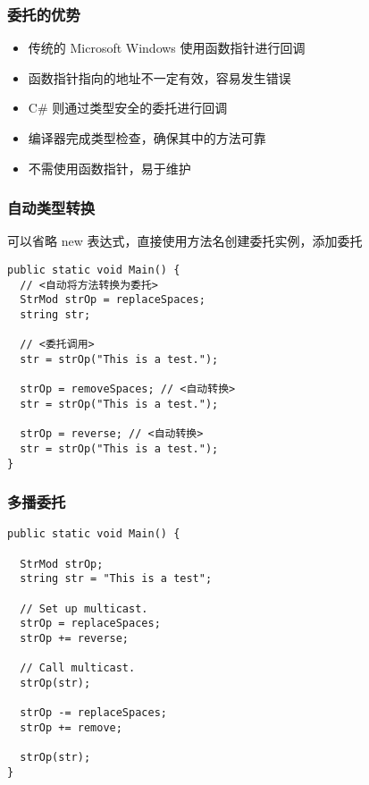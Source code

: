 \begin{frame}
\frametitle{委托的优势}

\begin{itemize}
\setlength{\itemsep}{6pt plus 1pt}
\item 传统的 Microsoft Windows 使用函数指针进行回调
\item 函数指针指向的地址不一定有效，容易发生错误
\item C\# 则通过类型安全的委托进行回调
\item 编译器完成类型检查，确保其中的方法可靠
\item 不需使用函数指针，易于维护
\end{itemize}

\end{frame}

\begin{frame}[fragile]
\frametitle{自动类型转换}
\CJKindent 可以省略 new 表达式，直接使用方法名创建委托实例，添加委托
\begin{lstlisting}[escapeinside=<>]
public static void Main() {
  // <自动将方法转换为委托>
  StrMod strOp = replaceSpaces;
  string str;

  // <委托调用>
  str = strOp("This is a test.");

  strOp = removeSpaces; // <自动转换>
  str = strOp("This is a test.");

  strOp = reverse; // <自动转换>
  str = strOp("This is a test.");
}
\end{lstlisting}
\end{frame}


\begin{frame}[fragile]
\frametitle{多播委托}
\begin{lstlisting}
public static void Main() {

  StrMod strOp;
  string str = "This is a test";

  // Set up multicast.
  strOp = replaceSpaces;
  strOp += reverse;

  // Call multicast.
  strOp(str);

  strOp -= replaceSpaces;
  strOp += remove;

  strOp(str);
}
\end{lstlisting}
\end{frame}

